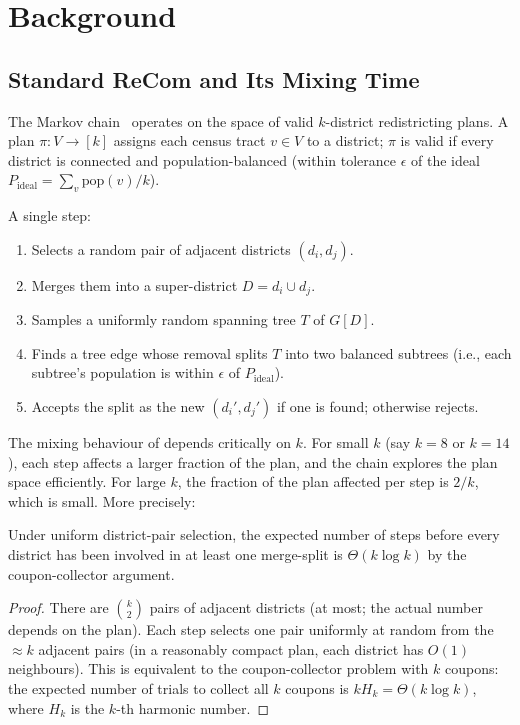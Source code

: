 \section{Background}
\label{sec:background}

\subsection{Standard ReCom and Its Mixing Time}

The \recom{} Markov chain~\citep{deford2021} operates on the space of
valid $k$-district redistricting plans.
A plan $\pi : V \to [k]$ assigns each census tract $v \in V$ to a district;
$\pi$ is valid if every district is connected and population-balanced
(within tolerance $\epsilon$ of the ideal $P_{\mathrm{ideal}} = \sum_v \mathrm{pop}(v) / k$).

A single \recom{} step:
\begin{enumerate}
  \item Selects a random pair of adjacent districts $(d_i, d_j)$.
  \item Merges them into a super-district $D = d_i \cup d_j$.
  \item Samples a uniformly random spanning tree $T$ of $G[D]$.
  \item Finds a tree edge whose removal splits $T$ into two balanced
        subtrees (i.e., each subtree's population is within $\epsilon$ of
        $P_{\mathrm{ideal}}$).
  \item Accepts the split as the new $(d_i', d_j')$ if one is found;
        otherwise rejects.
\end{enumerate}

The mixing behaviour of \recom{} depends critically on $k$.
For small $k$ (say $k = 8$ or $k = 14$), each step affects a larger
fraction of the plan, and the chain explores the plan space efficiently.
For large $k$, the fraction of the plan affected per step is $2/k$, which
is small.
More precisely:

\begin{proposition}
\label{prop:recom-mixing}
Under uniform district-pair selection, the expected number of \recom{} steps
before every district has been involved in at least one merge-split is
$\Theta(k \log k)$ by the coupon-collector argument.
\end{proposition}

\begin{proof}
There are $\binom{k}{2}$ pairs of adjacent districts (at most; the actual
number depends on the plan).
Each step selects one pair uniformly at random from the $\approx k$ adjacent
pairs (in a reasonably compact plan, each district has $O(1)$ neighbours).
This is equivalent to the coupon-collector problem with $k$ coupons: the
expected number of trials to collect all $k$ coupons is $k H_k = \Theta(k \log k)$,
where $H_k$ is the $k$-th harmonic number.
\end{proof}

